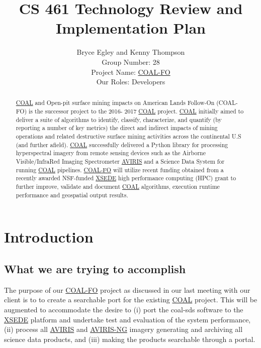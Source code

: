 \documentclass[10pt,draftclsnofoot,onecolumn,journal,compsoc]{IEEEtran}
\title{CS 461 Technology Review and Implementation Plan}
\author{Bryce Egley and Kenny Thompson \\ Group Number: 28 \\ Project Name: \href{http://eecs.oregonstate.edu/capstone/submission/?page=preview\&pid=320}{COAL-FO} \\ Our Roles: Developers}
\date{}
\begin{document}
\maketitle
  \begin{abstract}
	\href{https://capstone-coal.github.io/}{COAL} and Open-pit surface mining impacts on American Lands Follow-On (COAL-FO) is the successor project to the 2016-
2017 \href{https://capstone-coal.github.io/}{COAL} project. \href{https://capstone-coal.github.io/}{COAL} initially aimed to deliver a suite of algorithms to identify, classify, characterize, and quantify (by reporting a
number of key metrics) the direct and indirect impacts of mining operations and related destructive surface mining activities across the
continental U.S (and further afield). \href{https://capstone-coal.github.io/}{COAL} successfully delivered a Python library for processing hyperspectral imagery from remote
sensing devices such as the Airborne Visible/InfraRed Imaging Spectrometer \href{https://aviris.jpl.nasa.gov/}{AVIRIS} and a Science Data System for running \href{https://capstone-coal.github.io/}{COAL}
pipelines. \href{http://eecs.oregonstate.edu/capstone/cs/capstone.cgi?project=320}{COAL-FO} will utilize recent funding obtained from a recently awarded NSF-funded \href{https://www.xsede.org/}{XSEDE} high performance computing
(HPC) grant to further improve, validate and document \href{https://capstone-coal.github.io/}{COAL} algorithms, execution runtime performance and geospatial output
results.\cite{1}
  \end{abstract}
\newpage

\tableofcontents

\newpage

\section{Introduction}

\subsection{What we are trying to accomplish}

\noindent The purpose of our \href{http://eecs.oregonstate.edu/capstone/cs/capstone.cgi?project=320}{COAL-FO} project as discussed in our last meeting with our client is to to create a searchable port for the existing \href{https://capstone-coal.github.io/}{COAL} project. This will be augmented to accommodate the desire to (i) port the coal-sds software to the \href{https://www.xsede.org/}{XSEDE} platform and undertake test and evaluation of the system performance, (ii) process all \href{https://aviris.jpl.nasa.gov/}{AVIRIS} and \href{https://aviris-ng.jpl.nasa.gov/}{AVIRIS-NG} imagery generating and archiving all science data products, and (iii) making the products searchable through a portal. \newline
\end{document}
